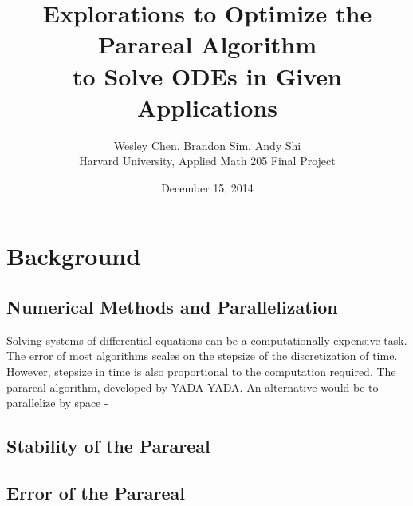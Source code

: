 \documentclass[letterpaper,twocolumn,11pt]{article}
\begin{document}
\title{Explorations to Optimize the Parareal Algorithm \\to Solve ODEs in Given Applications}
\author{Wesley Chen, Brandon Sim, Andy Shi \\
Harvard University, Applied Math 205 Final Project}
\date{December 15, 2014}

\setlength\parindent{0pt}

\setlength\parskip{2ex}

\section{Background}

\subsection{Numerical Methods and Parallelization}
Solving systems of differential equations can be a computationally expensive task.  The error of most algorithms scales on the stepsize of the discretization of time.  However, stepsize in time is also proportional to the computation required.  The parareal algorithm, developed by YADA YADA.  An alternative would be to parallelize by space - 

\subsection{Stability of the Parareal}

\subsection{Error of the Parareal}
\end{document}
